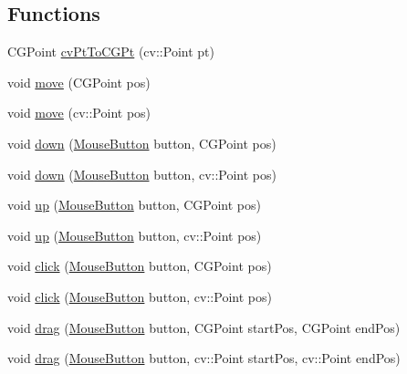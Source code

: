 \subsection*{Functions}
\begin{DoxyCompactItemize}
\item 
C\-G\-Point \hyperlink{namespacemouse_a79070f384b35609da75b77cf6e8927a6}{cv\-Pt\-To\-C\-G\-Pt} (cv\-::\-Point pt)
\item 
void \hyperlink{namespacemouse_a1aa19d41e15ecc34b3857d534f6ece0d}{move} (C\-G\-Point pos)
\item 
void \hyperlink{namespacemouse_acaa00a7edd06298d2bc17cefdcbb8fb6}{move} (cv\-::\-Point pos)
\item 
void \hyperlink{namespacemouse_a7321a1fda149eec822a35e87a96260eb}{down} (\hyperlink{namespacemouse_a185e90053251dae588490005b1953fee}{Mouse\-Button} button, C\-G\-Point pos)
\item 
void \hyperlink{namespacemouse_a607ecaa87d22645c6d9cefab000334cb}{down} (\hyperlink{namespacemouse_a185e90053251dae588490005b1953fee}{Mouse\-Button} button, cv\-::\-Point pos)
\item 
void \hyperlink{namespacemouse_a0af3fb86cc86ef2dc26197f91af7c77d}{up} (\hyperlink{namespacemouse_a185e90053251dae588490005b1953fee}{Mouse\-Button} button, C\-G\-Point pos)
\item 
void \hyperlink{namespacemouse_abb69652fb6c500e1432caa8b9f820d59}{up} (\hyperlink{namespacemouse_a185e90053251dae588490005b1953fee}{Mouse\-Button} button, cv\-::\-Point pos)
\item 
void \hyperlink{namespacemouse_a3bbccf75b153e8cd32a2f7b24b58465f}{click} (\hyperlink{namespacemouse_a185e90053251dae588490005b1953fee}{Mouse\-Button} button, C\-G\-Point pos)
\item 
void \hyperlink{namespacemouse_a1c6558bbb4c0fcac4f7e048e6ec46388}{click} (\hyperlink{namespacemouse_a185e90053251dae588490005b1953fee}{Mouse\-Button} button, cv\-::\-Point pos)
\item 
void \hyperlink{namespacemouse_a986f9759482024b9f338832e6ff2911d}{drag} (\hyperlink{namespacemouse_a185e90053251dae588490005b1953fee}{Mouse\-Button} button, C\-G\-Point start\-Pos, C\-G\-Point end\-Pos)
\item 
void \hyperlink{namespacemouse_a0c7fe082f4ed23b4c2940a1a6893d407}{drag} (\hyperlink{namespacemouse_a185e90053251dae588490005b1953fee}{Mouse\-Button} button, cv\-::\-Point start\-Pos, cv\-::\-Point end\-Pos)
\end{DoxyCompactItemize}


